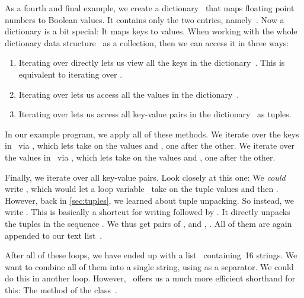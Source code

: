 As a fourth and final example, we create a dictionary~ that maps floating point numbers to Boolean values.
It contains only the two entries, namely~.
Now a dictionary is a bit special:
It maps keys to values.
When working with the whole dictionary data structure~ as a collection, then we can access it in three ways:
%
\begin{enumerate}%
%
\item Iterating over  directly lets us view all the keys in the dictionary~. %
This is equivalent to iterating over .%
%
\item Iterating over  lets us access all the values in the dictionary~.%
%
\item Iterating over  lets us access all key-value pairs in the dictionary~ as tuples.%
\end{enumerate}%
%
In our example program, we apply all of these methods.
We iterate over the keys in~ via , which lets  take on the values  and , one after the other.
We iterate over the values in~ via , which lets  take on the values  and , one after the other.%
%
\begin{sloppypar}%
Finally, we iterate over all key-value pairs.
Look closely at this one:
We \emph{could} write , which would let a loop variable~ take on the tuple values  and then .
However, back in \cref{sec:tuples}, we learned about tuple unpacking.
So instead, we write .
This is basically a shortcut for writing  followed by .
It directly unpacks the tuples in the sequence .
We thus get pairs of ,  and , .
All of them are again appended to our text list~.%
\end{sloppypar}%
%
After all of these loops, we have ended up with a list~ containing~16 strings.
We want to combine all of them into a single string, using  as a separator.
We could do this in another loop.
However, \python\ offers us a much more efficient shorthand for this:
The method  of the class~.

